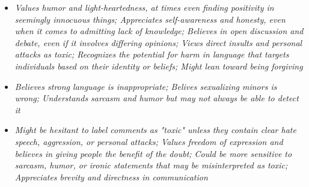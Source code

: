 \documentclass[11pt]{article}
\newcommand{\profiletext}[1]{\textit{#1}}
\begin{document}
\begin{itemize}
\item \profiletext{Values humor and light-heartedness, at times even finding positivity in seemingly innocuous things; Appreciates self-awareness and honesty, even when it comes to admitting lack of knowledge; Believes in open discussion and debate, even if it involves differing opinions; Views direct insults and personal attacks as toxic; Recognizes the potential for harm in language that targets individuals based on their identity or beliefs; Might lean toward being forgiving}
\item \profiletext{Believes strong language is inappropriate; Belives sexualizing minors is wrong; Understands sarcasm and humor but may not always be able to detect it}
\item \profiletext{Might be hesitant to label comments as "toxic" unless they contain clear hate speech, aggression, or personal attacks; Values freedom of expression and believes in giving people the benefit of the doubt; Could be more sensitive to sarcasm, humor, or ironic statements that may be misinterpreted as toxic; Appreciates brevity and directness in communication}
\end{itemize}
\end{document}
